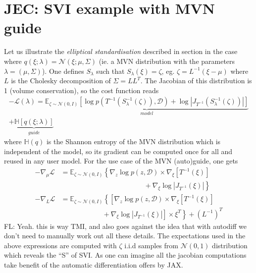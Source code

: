 \documentclass[twocolumn,twocolappendix,nofootinbib,iop]{openjournal}
\newcommand{\FrL}[1]{{\color{cyan}FL: #1}}
\newcommand{\JEC}[1]{{\color{magenta}JEC: #1}}
\newcommand{\nn}{\nonumber}
\begin{document}
\section{\JEC{SVI example with MVN guide}}
\label{app-SVI_MVN}
Let us illustrate the \textit{elliptical standardisation} described in section \label{ec-SVI} in the case where $q(\xi; \lambda) = \mathcal{N}(\xi; \mu, \Sigma)$ (ie. a MVN distribution with the parameters $\lambda=(\mu, \Sigma)$). One defines $S_\lambda$ such that $S_\lambda(\xi)=\zeta$, eg. $\zeta = L^{-1}(\xi-\mu)$ where $L$ is the Cholesky decomposition of $\Sigma=LL^T$. The Jacobian of this distribution is 1 (volume conservation), so the cost function reads
\begin{multline}
-\mathcal{L}(\lambda) = \underbrace{\mathbb{E}_{\zeta\sim \mathcal{N}(0,I)}\left[ \log p(T^{-1}(S_\lambda^{-1}(\zeta)),\mathcal{D}) + \log |J_{T^{-1}}(S_\lambda^{-1}(\zeta))| \right]}_{model} \\ + \underbrace{\mathbb{H}[q(\xi;\lambda)]}_{guide}
\label{eq-loss-svi-3b}
\end{multline}
where $\mathbb{H}(q)$ is the Shannon entropy of the MVN distribution which is independent of the model, so its gradient can be computed once for all and reused in any user model.  
For the use case of the MVN (auto)guide, one gets
\begin{align}
-\nabla_\mu \mathcal{L} &= \mathbb{E}_{\zeta\sim \mathcal{N}(0,I)}\left\{
\nabla_z \log p(z,\mathcal{D}) \times \nabla_\xi[T^{-1}(\xi)] \right. \nn \\
& \left. \qquad \qquad \qquad \qquad \qquad \qquad + \nabla_\xi \log|J_{T^{-1}}(\xi)| \right\} \nn \\
-\nabla_L \mathcal{L} &= \mathbb{E}_{\zeta\sim \mathcal{N}(0,I)}\left\{
\left[ \nabla_z \log p(z,\mathcal{D}) \times \nabla_\xi[T^{-1}(\xi)] \right.\right. \nn\\
&\left. \left. \qquad\qquad\qquad + \nabla_\xi \log|J_{T^{-1}}(\xi)| \right] \times \xi^T 
\right\}+ (L^{-1})^T
\end{align}
\FrL{Yeah. this is way TMI, and also goes against the idea that with autodiff we don't need to manually work out all these details.} The expectations used in the above expressions are computed with $\zeta$ i.i.d samples from $\mathcal{N}(0,1)$ distribution which reveals the ``S'' of SVI. As one can imagine all the jacobian computations take benefit of the automatic differentiation offers by JAX.
% 
 
\typeout{}


\end{document}
